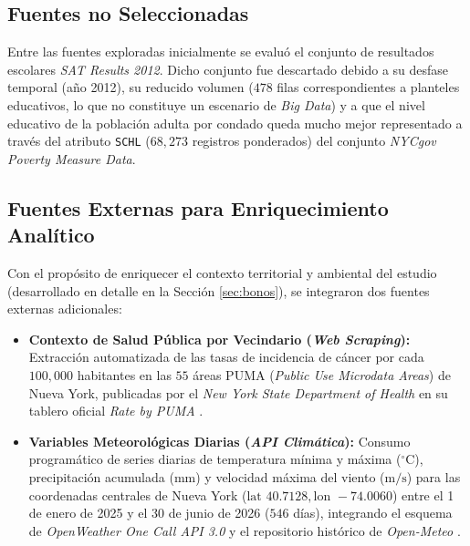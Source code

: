 \documentclass[11pt,a4paper]{article}
\begin{document}
\subsection{Fuentes no Seleccionadas}
Entre las fuentes exploradas inicialmente se evaluó el conjunto de resultados escolares \textit{SAT Results 2012}. Dicho conjunto fue descartado debido a su desfase temporal (año 2012), su reducido volumen ($478$ filas correspondientes a planteles educativos, lo que no constituye un escenario de \textit{Big Data}) y a que el nivel educativo de la población adulta por condado queda mucho mejor representado a través del atributo \texttt{SCHL} ($68,273$ registros ponderados) del conjunto \textit{NYCgov Poverty Measure Data}.

\subsection{Fuentes Externas para Enriquecimiento Analítico}
\label{subsec:fuentes_externas_seleccion}

Con el propósito de enriquecer el contexto territorial y ambiental del estudio (desarrollado en detalle en la Sección \ref{sec:bonos}), se integraron dos fuentes externas adicionales:

\begin{itemize}
    \item \textbf{Contexto de Salud Pública por Vecindario (\textit{Web Scraping}):} Extracción automatizada de las tasas de incidencia de cáncer por cada $100,000$ habitantes en las $55$ áreas PUMA (\textit{Public Use Microdata Areas}) de Nueva York, publicadas por el \textit{New York State Department of Health} en su tablero oficial \textit{Rate by PUMA} \cite{nys_cancer_registry_2026}.
    \item \textbf{Variables Meteorológicas Diarias (\textit{API Climática}):} Consumo programático de series diarias de temperatura mínima y máxima ($^\circ\text{C}$), precipitación acumulada ($\text{mm}$) y velocidad máxima del viento ($\text{m/s}$) para las coordenadas centrales de Nueva York ($\text{lat } 40.7128, \text{lon } -74.0060$) entre el 1 de enero de 2025 y el 30 de junio de 2026 ($546$ días), integrando el esquema de \textit{OpenWeather One Call API 3.0} \cite{openweather_onecall_2026} y el repositorio histórico de \textit{Open-Meteo} \cite{openmeteo_historical_2026}.
\end{itemize}



\end{document}
